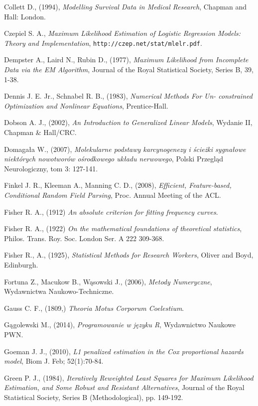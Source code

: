 \begin{thebibliography}{99}
 Collett D., (1994), \textit{Modelling Survival Data in Medical Research}, Chapman and Hall:
London.

 Czepiel S. A., \textit{Maximum Likelihood Estimation of Logistic Regression Models: Theory and Implementation}, \texttt{http://czep.net/stat/mlelr.pdf}.

 Dempster A., Laird N., Rubin D., (1977), \textit{Maximum Likelihood from Incomplete Data via the
EM Algorithm}, Journal of the Royal Statistical Society, Series B, 39, 1-38.


 Dennis J. E. Jr., Schnabel R. B., (1983), \textit{Numerical Methods For Un-
constrained Optimization and Nonlinear Equations}, Prentice-Hall.

 Dobson A. J., (2002), \textit{An Introduction to Generalized Linear Models}, Wydanie II, Chapman \& Hall/CRC.

 Domagała W., (2007), \textit{Molekularne podstawy karcynogenezy i ścieżki sygnałowe niektórych nowotworów ośrodkowego układu nerwowego}, Polski Przegląd Neurologiczny, tom 3: 127-141.

  Finkel J. R., Kleeman A., Manning C. D., (2008), \textit{Efficient, Feature-based, Conditional Random Field Parsing}, Proc. Annual Meeting of the ACL.

 Fisher R. A., (1912) \textit{An absolute criterion for fitting frequency curves}.

 Fisher R. A., (1922) \textit{On the mathematical foundations of theoretical statistics}, Philos. Trans. Roy. Soc. London Ser. A 222 309-368.

 Fisher R., A., (1925), \textit{Statistical Methods for Research Workers}, Oliver and Boyd, Edinburgh.

 Fortuna Z., Macukow B., Wąsowski J., (2006), \textit{Metody Numeryczne}, Wydawnictwa Naukowo-Techniczne.

 Gauss C. F., (1809,) \textit{Theoria Motus Corporum Coelestium}.

 Gągolewski M., (2014), \textit{Programowanie w języku R}, Wydawnictwo Naukowe PWN.

 Goeman J. J., (2010), \textit{L1 penalized estimation in the Cox proportional hazards model}, Biom J. Feb; 52(1):70-84.

 Green P. J., (1984), \textit{Iteratively Reweighted Least Squares for Maximum Likelihood Estimation, and Some Robust and Resistant Alternatives}, Journal of the Royal Statistical Society, Series B (Methodological), pp. 149-192.



\end{thebibliography}
